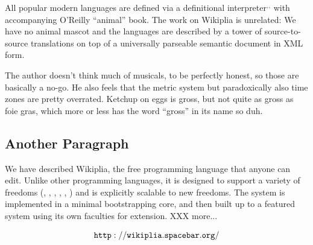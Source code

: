 \documentclass[twocolumn]{article}
\begin{document}
All popular modern languages are defined via a definitional
interpreter$^,$$^,$ with accompanying O'Reilly ``animal''
book.\z{} The work on Wikiplia is unrelated: We
have no animal mascot and the languages are described
by a tower of source-to-source translations on top of a universally
parseable semantic document in XML form.

The author doesn't think much of musicals,\z{} to
be perfectly honest,\z{} so those
are basically a no-go. He also feels that the metric
system but paradoxically also
time zones are pretty overrated.
Ketchup on eggs is
gross,\z{} but not quite as gross as foie gras, which more or less has the word ``gross'' in its name so
duh.\z{}

\subsection{Another Paragraph}

We have described Wikiplia, the free programming language that anyone
can edit. Unlike other programming languages, it is designed to
support a variety of freedoms (\ftinker, \fexpression, \fbeer, \fusa,
\ffree, \ftobe) and is explicitly scalable to new freedoms. The system
is implemented in a minimal bootstrapping core, and then built up to
a featured system using its own faculties for extension. XXX more...

\bigskip
$${\tt http://wikiplia.spacebar.org/}$$
\end{document}

